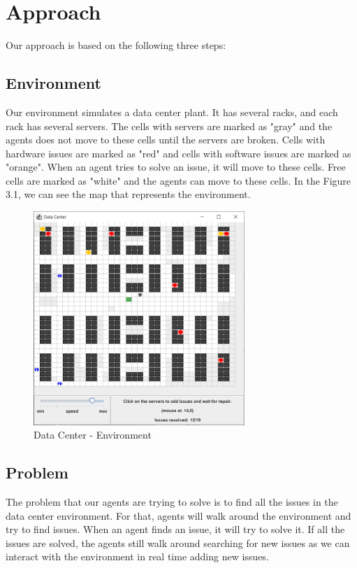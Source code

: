 \documentclass[letterpaper]{article}
\begin{document}
\section{Approach}\label{sec:approach}

Our approach is based on the following three steps:

\subsection{Environment}

Our environment simulates a data center plant. It has several racks, and each rack has several servers. The cells with servers are marked as "gray" and the agents does not move to these cells until the servers are broken. Cells with hardware issues are marked as "red" and cells with software issues are marked as "orange". When an agent tries to solve an issue, it will move to these cells. Free cells are marked as "white" and the agents can move to these cells. In the Figure 3.1, we can see the map that represents the environment.

\begin{figure}[ht]
    \centering
    \includegraphics[width=8cm]{images/world.png}
    \caption{Data Center - Environment}
    \label{fig:data-center-env}
\end{figure}

\subsection{Problem}

The problem that our agents are trying to solve is to find all the issues in the data center environment. For that, agents will walk around the environment and try to find issues. When an agent finds an issue, it will try to solve it. If all the issues are solved, the agents still walk around searching for new issues as we can interact with the environment in real time adding new issues.
\end{document}
